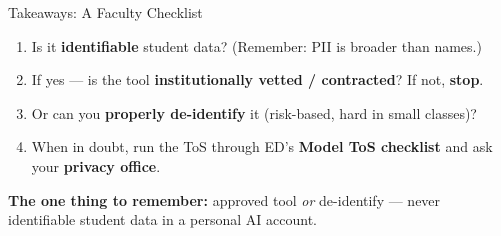 \documentclass[aspectratio=169, 10pt]{beamer}
\begin{document}
\begin{frame}{Takeaways: A Faculty Checklist}
\vskip2pt
\begin{tcolorbox}[keybox, title={\faClipboardCheck\quad Before you put student data in any AI tool}]
\small
\begin{enumerate}\setlength{\itemsep}{4pt}
  \item Is it \textbf{identifiable} student data? (Remember: PII is broader than names.)
  \item If yes --- is the tool \textbf{institutionally vetted / contracted}? If not, \textbf{stop}.
  \item Or can you \textbf{properly de-identify} it (risk-based, hard in small classes)?
  \item When in doubt, run the ToS through ED's \textbf{Model ToS checklist} and ask your \textbf{privacy office}.
\end{enumerate}
\end{tcolorbox}
\vskip6pt
\begin{tcolorbox}[accentbox, width=12.5cm]
\centering\small \textbf{The one thing to remember:} approved tool \emph{or} de-identify --- never identifiable student data in a personal AI account.
\end{tcolorbox}
\end{frame}
\end{document}

